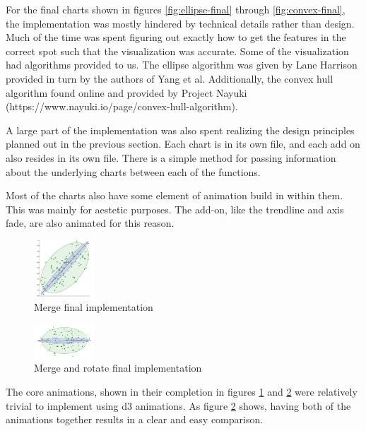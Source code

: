 \documentclass{proc}
\begin{document}
		For the final charts shown in figures \ref{fig:ellipse-final} through \ref{fig:convex-final}, the implementation was mostly hindered by technical details rather than design. Much of the time was spent figuring out exactly how to get the features in the correct spot such that the visualization was accurate. Some of the visualization had algorithms provided to us. The ellipse algorithm was given by Lane Harrison provided in turn by the authors of Yang et al. Additionally, the convex hull algorithm found online and provided by Project Nayuki (https://www.nayuki.io/page/convex-hull-algorithm). 
		
		A large part of the implementation was also spent realizing the design principles planned out in the previous section. Each chart is in its own file, and each add on also resides in its own file. There is a simple method for passing information about the underlying charts between each of the functions. 
		
		Most of the charts also have some element of animation build in within them. This was mainly for aestetic purposes. The add-on, like the trendline and axis fade, are also animated for this reason.
		
		\begin{figure}[t]
			\centering
			\includegraphics[width=0.2\textwidth]{merge}
			\caption{Merge final implementation}
			\label{fig:merge}
		\end{figure}
		\begin{figure}[t]
			\centering
			\includegraphics[width=0.2\textwidth]{merge-rotate}
			\caption{Merge and rotate final implementation}
			\label{fig:merge-rotate}
		\end{figure}
	
		The core animations, shown in their completion in figures \ref{fig:merge} and \ref{fig:merge-rotate} were relatively trivial to implement using d3 animations. As figure \ref{fig:merge-rotate} shows, having both of the animations together results in a clear and easy comparison. 
		
\end{document}
